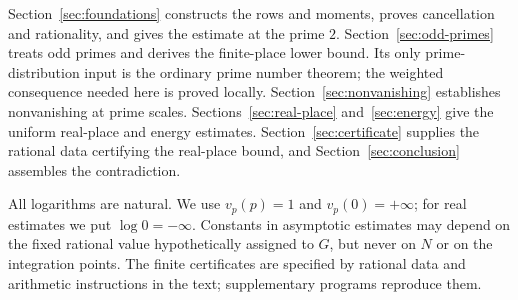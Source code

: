 Section~\ref{sec:foundations} constructs the rows and moments, proves
cancellation and rationality, and gives the estimate at the prime $2$.
Section~\ref{sec:odd-primes} treats odd primes and derives the
finite-place lower bound. Its only prime-distribution input is the
ordinary prime number theorem; the weighted consequence needed here
is proved locally. Section~\ref{sec:nonvanishing} establishes
nonvanishing at prime scales. Sections~\ref{sec:real-place}
and~\ref{sec:energy} give the uniform real-place and energy estimates.
Section~\ref{sec:certificate} supplies the rational data certifying the real-place bound,
and Section~\ref{sec:conclusion} assembles the contradiction.

All logarithms are natural. We use $v_p(p)=1$ and $v_p(0)=+\infty$;
for real estimates we put $\log 0=-\infty$.
Constants in asymptotic estimates may depend on the fixed rational value
hypothetically assigned to $G$, but never on $N$ or on the integration
points. The finite certificates are specified by rational data and
arithmetic instructions in the text; supplementary programs reproduce them.
